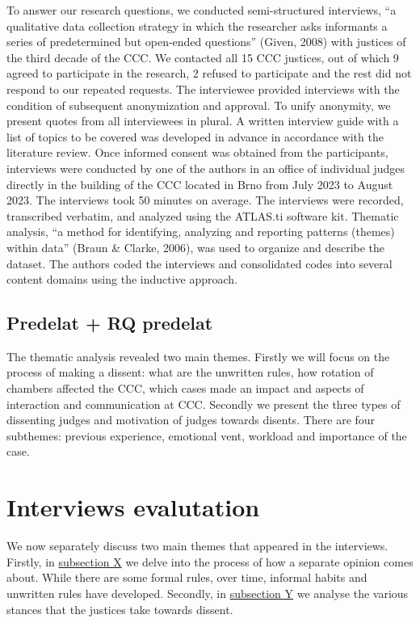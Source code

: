 \documentclass[
  11pt,
]{article}
\begin{document}
To answer our research questions, we conducted semi-structured interviews, ``a qualitative data collection strategy in which the researcher asks informants a series of predetermined but open-ended questions'' (Given, 2008) with justices of the third decade of the CCC.
We contacted all 15 CCC justices, out of which 9 agreed to participate in the research, 2 refused to participate and the rest did not respond to our repeated requests. The interviewee provided interviews with the condition of subsequent anonymization and approval. To unify anonymity, we present quotes from all interviewees in plural.
A written interview guide with a list of topics to be covered was developed in advance in accordance with the literature review. Once informed consent was obtained from the participants, interviews were conducted by one of the authors in an office of individual judges directly in the building of the CCC located in Brno from July 2023 to August 2023. The interviews took 50 minutes on average.
The interviews were recorded, transcribed verbatim, and analyzed using the ATLAS.ti software kit. Thematic analysis, ``a method for identifying, analyzing and reporting patterns (themes) within data'' (Braun \& Clarke, 2006), was used to organize and describe the dataset. The authors coded the interviews and consolidated codes into several content domains using the inductive approach.

\subsection{Predelat + RQ predelat}\label{predelat-rq-predelat}

The thematic analysis revealed two main themes. Firstly we will focus on the process of making a dissent: what are the unwritten rules, how rotation of chambers affected the CCC, which cases made an impact and aspects of interaction and communication at CCC. Secondly we present the three types of dissenting judges and motivation of judges towards disents. There are four subthemes: previous experience, emotional vent, workload and importance of the case.

\section{Interviews evalutation}\label{interviews-evalutation}

We now separately discuss two main themes that appeared in the interviews. Firstly, in \hyperref[birth]{subsection X} we delve into the process of how a separate opinion comes about. While there are some formal rules, over time, informal habits and unwritten rules have developed. Secondly, in \hyperref[stances]{subsection Y} we analyse the various stances that the justices take towards dissent.
\end{document}
